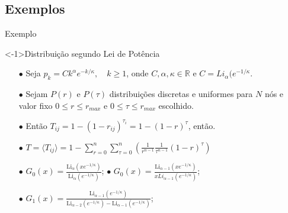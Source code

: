 \documentclass{beamer}
\begin{document}

\subsection{Exemplos}

\begin{frame}{Exemplo}
\begin{exampleblock}
    <-1>{Distribuição segundo Lei de Potência}
    \begin{itemize}

        \item[$\bullet$] Seja $p_k = C k^{\alpha} e ^{-k/ \kappa}, \quad k \geq 1$, 
            onde $C, \alpha, \kappa \in \mathbb{R}$ e $C = Li_\alpha (e^{-1/\kappa}.$

        \item[$\bullet$] Sejam $P(r)$ e $P(\tau)$ distribuições discretas e uniformes para $N$ nós e 
            valor fixo $ 0 \leq r \leq r_{max}$  e $0 \leq \tau \leq r_{max}$ escolhido.

        \item[$\bullet$] Então $T_{ij} = 1 -  (1 - r_{ij})^{\tau_i} = 1 - (1 - r)^\tau$, então.
        \item[$\bullet$] 
    $T = \langle T_{ij} \rangle = 1 - \sum_{r=0}^n \sum_{\tau=0}^n \left(  
    \frac{1}{r^{n-1}} \frac{1}{\tau^{n-1}}  (1 - r)^\tau \right)$

\item[$\bullet$] $G_0 (x) = \frac{\mathrm{Li} _\alpha ( x e ^{-1/\kappa})}{ \mathrm{Li}   _\alpha (  e ^{-1/\kappa})}$;
    \qquad $\bullet$ $G_0 (x) = \frac{\mathrm{Li} _{\alpha-1} ( x e ^{-1/\kappa})}{x L i _{\alpha-1} (  e ^{-1/\kappa})}$;
\item[$\bullet$]             
    $G_1 (x) = \frac{\mathrm{Li} _{\alpha-1} ( e ^{-1/\kappa})}{ \mathrm{Li}  _{\alpha-2} (  e ^{-1/\kappa})-  \mathrm{Li}  _{\alpha-1} (  e ^{-1/\kappa}) }$;
    \end{itemize}
    
\end{exampleblock}

\end{frame}



\end{document}
